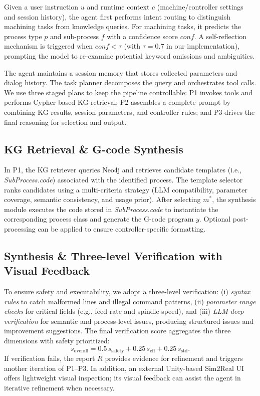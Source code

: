 \documentclass[journal,twoside,web]{ieeecolor}
\begin{document}
Given a user instruction $u$ and runtime context $c$ (machine/controller settings and session history), the agent first performs intent routing to distinguish machining tasks from knowledge queries. For machining tasks, it predicts the process type $p$ and sub-process $f$ with a confidence score $conf$. A self-reflection mechanism is triggered when $conf<\tau$ (with $\tau=0.7$ in our implementation), prompting the model to re-examine potential keyword omissions and ambiguities.

The agent maintains a session memory that stores collected parameters and dialog history. The task planner decomposes the query and orchestrates tool calls. We use three staged plans to keep the pipeline controllable: P1 invokes tools and performs Cypher-based KG retrieval; P2 assembles a complete prompt by combining KG results, session parameters, and controller rules; and P3 drives the final reasoning for selection and output.

\subsection{KG Retrieval \& G-code Synthesis}

In P1, the KG retriever queries Neo4j and retrieves candidate templates (i.e., \textit{SubProcess.code}) associated with the identified process. The template selector ranks candidates using a multi-criteria strategy (LLM compatibility, parameter coverage, semantic consistency, and usage prior). After selecting $m^{\ast}$, the synthesis module executes the code stored in \textit{SubProcess.code} to instantiate the corresponding process class and generate the G-code program $y$. Optional post-processing can be applied to ensure controller-specific formatting.

\subsection{Synthesis \& Three-level Verification with Visual Feedback}

To ensure safety and executability, we adopt a three-level verification: (i) \textit{syntax rules} to catch malformed lines and illegal command patterns, (ii) \textit{parameter range checks} for critical fields (e.g., feed rate and spindle speed), and (iii) \textit{LLM deep verification} for semantic and process-level issues, producing structured issues and improvement suggestions. The final verification score aggregates the three dimensions with safety prioritized:
\begin{equation}
    s_{\text{overall}} = 0.5\,s_{\text{safety}} + 0.25\,s_{\text{eff}} + 0.25\,s_{\text{std}}.
\end{equation}
If verification fails, the report $R$ provides evidence for refinement and triggers another iteration of P1--P3. In addition, an external Unity-based Sim2Real UI offers lightweight visual inspection; its visual feedback can assist the agent in iterative refinement when necessary.
\end{document}
